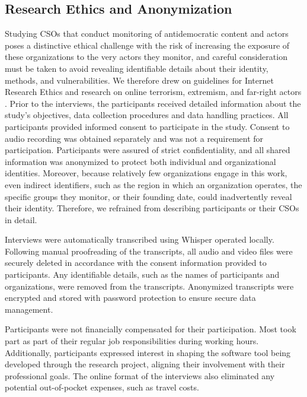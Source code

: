 \documentclass[acmsmall]{acmart}
\begin{document}
\subsection{Research Ethics and Anonymization}
\label{sec:research_ethics}
Studying CSOs that conduct monitoring of antidemocratic content and actors poses a distinctive ethical challenge with the risk of increasing the exposure of these organizations to the very actors they monitor, and careful consideration must be taken to avoid revealing identifiable details about their identity, methods, and vulnerabilities. We therefore drew on guidelines for Internet Research Ethics \cite{franzke_internet_2020} and research on online terrorism, extremism, and far-right actors \cite{conway_online_2021,massanari_rethinking_2018}. Prior to the interviews, the participants received detailed information about the study's objectives, data collection procedures and data handling practices. All participants provided informed consent to participate in the study. Consent to audio recording was obtained separately and was not a requirement for participation. Participants were assured of strict confidentiality, and all shared information was anonymized to protect both individual and organizational identities. 
Moreover, because relatively few organizations engage in this work, even indirect identifiers, such as the region in which an organization operates, the specific groups they monitor, or their founding date, could inadvertently reveal their identity. Therefore, we refrained from describing participants or their CSOs in detail.

Interviews were automatically transcribed using Whisper\citet{open_ai_introducing_2022} operated locally. Following manual proofreading of the transcripts, all audio and video files were securely deleted in accordance with the consent information provided to participants. Any identifiable details, such as the names of participants and organizations, were removed from the transcripts. Anonymized transcripts were encrypted and stored with password protection to ensure secure data management.

Participants were not financially compensated for their participation. Most took part as part of their regular job responsibilities during working hours. Additionally, participants expressed interest in shaping the software tool being developed through the research project, aligning their involvement with their professional goals. The online format of the interviews also eliminated any potential out-of-pocket expenses, such as travel costs.
\end{document}

